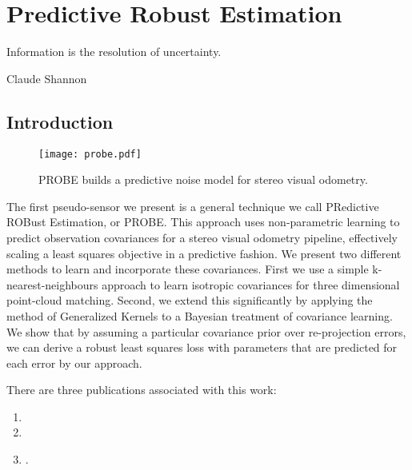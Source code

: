 \chapter{Predictive Robust Estimation}
\label{ch:probe}
\epigraph{Information is the resolution of uncertainty.}{Claude Shannon}

\section{Introduction}

\begin{figure*}[h!]
\centering
\texttt{[image: probe.pdf]}
 \caption{PROBE builds a predictive noise model for stereo visual odometry.}
 \label{fig:probe_intro_fig}
\end{figure*}

The first pseudo-sensor we present is a general technique we call PRedictive ROBust Estimation, or PROBE. This approach uses non-parametric learning to predict observation covariances for a stereo visual odometry pipeline, effectively scaling a least squares objective in a predictive fashion. We present two different methods to learn and incorporate these covariances. First we use a simple k-nearest-neighbours approach to learn isotropic covariances for three dimensional point-cloud matching. Second, we extend this significantly by applying the method of Generalized Kernels to a Bayesian treatment of covariance learning. We show that by assuming a particular covariance prior over re-projection errors, we can derive a robust least squares loss with parameters that are predicted for each  error by our approach.

There are three publications associated with this work:
\begin{enumerate}
\item {}
\item {}
\item {}.
\end{enumerate}




